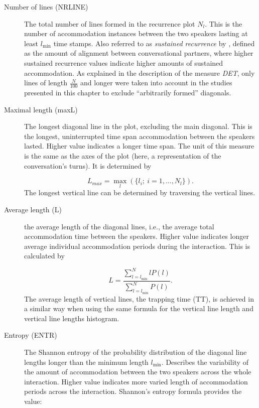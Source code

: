 \begin{description}
	\item[Number of lines (NRLINE)] The total number of lines formed in the recurrence plot $N_l$.
	This is the number of accommodation instances between the two speakers lasting at least $l_{\min}$ time stamps.
	Also referred to as \emph{sustained recurrence} by \citet{Borrie2019syncing}, defined as the amount of alignment between conversational partners, where higher sustained recurrence values indicate higher amounts of sustained accommodation.
	As explained in the description of the measure \emph{DET}, only lines of length $\frac{N}{100}$ and longer were taken into account in the studies presented in this chapter to exclude \enquote{arbitrarily formed} diagonals.
	
	\item[Maximal length (maxL)] The longest diagonal line in the plot, excluding the main diagonal.	
	This is the longest, uninterrupted time span accommodation between the speakers lasted.
	Higher value indicates a longer time span.
	The unit of this measure is the same as the axes of the plot (here, a representation of the conversation's turns).
	It is determined by

	\begin{equation}
		\label{eq:maxl}
		L_{max} = \max_{l} (\{l_i; \ i=1, \ldots, N_l\}).
	\end{equation}
	The longest vertical line can be determined by traversing the vertical lines.
	
	\item[Average length (L)] the average length of the diagonal lines, i.e., the average total accommodation time between the speakers.
	Higher value indicates longer average individual accommodation periods during the interaction.
	This is calculated by
	
	\begin{equation}
		\label{eq:l}
		L = \frac{\sum_{l=l_{\min}}^N l P(l)}{\sum_{l=l_{\min}}^N  P(l)}.
	\end{equation}
	The average length of vertical lines, the trapping time (TT), is achieved in a similar way when using the same formula for the vertical line length and vertical line lengths histogram.

	
	\item[Entropy (ENTR)]The Shannon entropy of the probability distribution of the diagonal line lengths longer than the minimum length $l_{\min}$.
	Describes the variability of the amount of accommodation between the two speakers across the whole interaction.
	Higher value indicates more varied length of accommodation periods across the interaction.
	Shannon's entropy formula provides the value:
	

\end{description}
